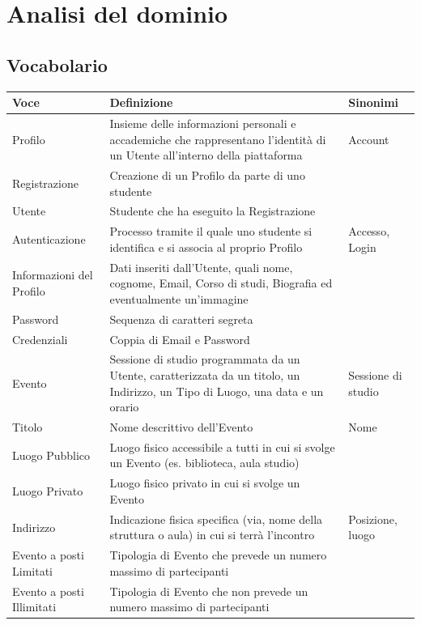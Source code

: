 \documentclass[12pt,a4paper]{report}
\begin{document}
\newpage
\section{Analisi del dominio}

\subsection{Vocabolario}
\begin{tabularx}{\textwidth}{|p{3cm}|X|p{3.5cm}|}
    \hline
    \rowcolor{studyColor} \textbf{Voce} & \textbf{Definizione} & \textbf{Sinonimi} \\ \hline
    \endhead
    Profilo & Insieme delle informazioni personali e accademiche che rappresentano l'identità di un Utente all'interno della piattaforma & Account \\ \hline
    Registrazione & Creazione di un Profilo da parte di uno studente & \\ \hline
    Utente & Studente che ha eseguito la Registrazione & \\ \hline
    Autenticazione & Processo tramite il quale uno studente si identifica e si associa al proprio Profilo & Accesso, Login \\ \hline
    Informazioni del Profilo & Dati inseriti dall'Utente, quali nome, cognome, Email, Corso di studi, Biografia ed eventualmente un'immagine & \\ \hline
    Password & Sequenza di caratteri segreta & \\ \hline
    Credenziali & Coppia di Email e Password & \\ \hline
    Evento & Sessione di studio programmata da un Utente, caratterizzata da un titolo, un Indirizzo, un Tipo di Luogo, una data e un orario & Sessione di studio \\ \hline
    Titolo & Nome descrittivo dell'Evento & Nome \\ \hline
    Luogo Pubblico & Luogo fisico accessibile a tutti in cui si svolge un Evento (es. biblioteca, aula studio) & \\ \hline
    Luogo Privato & Luogo fisico privato in cui si svolge un Evento & \\ \hline
    Indirizzo & Indicazione fisica specifica (via, nome della struttura o aula) in cui si terrà l'incontro & Posizione, luogo \\ \hline
    Evento a posti Limitati & Tipologia di Evento che prevede un numero massimo di partecipanti & \\ \hline
    Evento a posti Illimitati & Tipologia di Evento che non prevede un numero massimo di partecipanti & \\ \hline

\end{tabularx}
\end{document}
